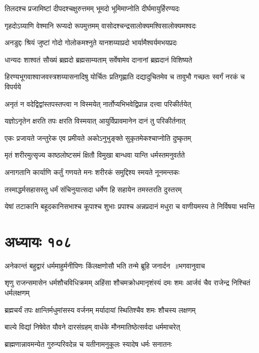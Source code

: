 \twolineshloka
{तिलदश्च प्रजामिष्टां दीपदश्चक्षुरुत्तमम्}
{भूमदो भूमिमाप्नोति दीर्घमायुर्हिरण्यदः}


\twolineshloka
{गृहदोऽग्र्याणि वेश्मानि रूप्यदो रूपमुत्तमम्}
{वासोदश्चन्द्रसालोक्यमश्विसालोक्यमश्वदः}


\twolineshloka
{अनडुद्दः श्रियं जुष्टां गोदो गोलोकमश्नुते}
{यानशय्याप्रदो भार्यामैश्वर्यमभयप्रदः}


\twolineshloka
{धान्यदः शाश्वतं सौख्यं ब्रह्मदो ब्रह्मसाम्यताम्}
{सर्वेषामेव दानानां ब्रह्मदानं विशिष्यते}


\threelineshloka
{हिरण्यभूगवाश्वाजवस्त्रशय्यासनादिषु}
{योर्चितः प्रतिगृह्णाति दद्यादुचितमेव च}
{तावुभौ गच्छतः स्वर्गं नरकं च विपर्यये}


\twolineshloka
{अनृतं न वदेद्विद्वांस्तपस्तप्त्वा न विस्मयेत्}
{नार्तोप्यभिभवेद्विप्रान्न दत्त्वा परिकीर्तयेत्}


\twolineshloka
{यज्ञोऽनृतेन क्षरति तपः क्षरति विस्मयात्}
{आयुर्विप्रावमानेन दानं तु परिकीर्तनात्}


\twolineshloka
{एकः प्रजायते जन्तुरेक एव प्रमीयते}
{अकोऽनुभुङ्क्ते सुकृतमेकश्चाप्नोति दुष्कृतम्}


\twolineshloka
{मृतं शरीरमुत्सृज्य काष्ठलोष्टसमं क्षितौ}
{विमुखा बान्धवा यान्ति धर्मस्तमनुवर्तते}


\twolineshloka
{अनागतानि कार्याणि कर्तुं गणयते मनः}
{शरीरकं समुद्दिश्य स्मयते नूनमन्तकः}


\twolineshloka
{तस्माद्धर्मसहासस्तु धर्मं संचिनुयात्सदा}
{धर्मेण हि सहायेन तमस्तरति दुस्तरम्}


\twolineshloka
{येषां तटाकानि बहूदकानिसभाश्च कूपाश्च शुभाः प्रपाश्च}
{अन्नप्रदानं मधुरा च वाणीयमस्य ते निर्विषया भवन्ति}


\chapter{अध्यायः १०८}
\threelineshloka
{अनेकान्तं बहुद्वारं धर्ममाहुर्मनीपिणः}
{किंलक्षणोसौ भति तन्मे ब्रूहि जनार्दन ॥भगवानुवाच}
{}


\threelineshloka
{शृणु राजन्समासेन धर्मशौचविधिक्रमम्}
{अहिंसा शौचमक्रोधमानृशंस्यं दमः शमः}
{आर्जवं चैव राजेन्द्र निश्चितं धर्मलक्षणम्}


\twolineshloka
{ब्रह्मचर्यं तपः क्षान्तिर्मधुमांसस्य वर्जनम्}
{मर्यादायां स्थितिश्चैव शमः शौचस्य लक्षणम्}


\twolineshloka
{बाल्ये विद्यां निषेवेत यौवने दारसंग्रहम्}
{वार्धके मौनमातिष्ठेत्सर्वदा धर्ममाचरेत्}


\twolineshloka
{ब्राह्मणान्नावमन्येत गुरुन्परिवदेन्न च}
{यतीनामनुकूलः स्यादेष धर्मः सनातनः}


